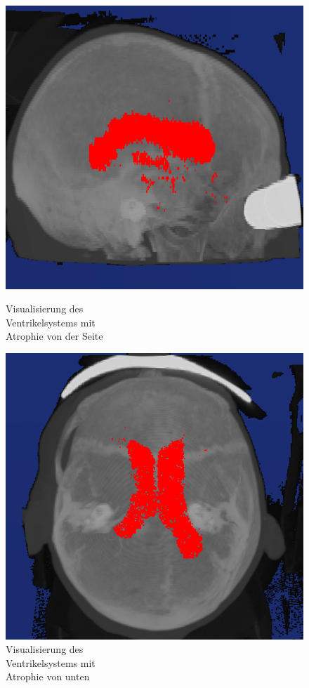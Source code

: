 \begin{figure}[H]
\begin{minipage}[t]{.5\textwidth}
  \centering
  \includegraphics[width=.9\linewidth, height=.9\linewidth]{Logos/Atrophie/Seite2.PNG}
  \caption{Visualisierung des \\ Ventrikelsystems mit \\ Atrophie von der Seite}
  \label{fig:atro_s}
\end{minipage}%
\begin{minipage}[t]{.5\textwidth}
  \centering
  \includegraphics[width=.9\linewidth, height=.9\linewidth]{Logos/Atrophie/Unten3.PNG}
  \caption{Visualisierung des \\ Ventrikelsystems mit \\ Atrophie von unten}
  \label{fig:atro_u}
\end{minipage}
\end{figure}



